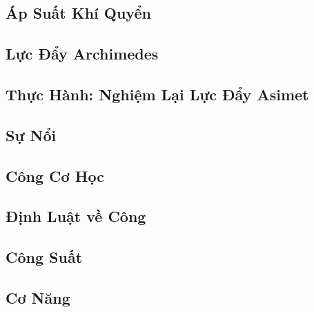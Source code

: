 \documentclass{article}
\numberwithin{equation}{section}
\begin{document}

\subsection{Áp Suất Khí Quyển}


\subsection{Lực Đẩy Archimedes}


\subsection{Thực Hành: Nghiệm Lại Lực Đẩy Asimet}


\subsection{Sự Nổi}


\subsection{Công Cơ Học}


\subsection{Định Luật về Công}


\subsection{Công Suất}


\subsection{Cơ Năng}
\end{document}
